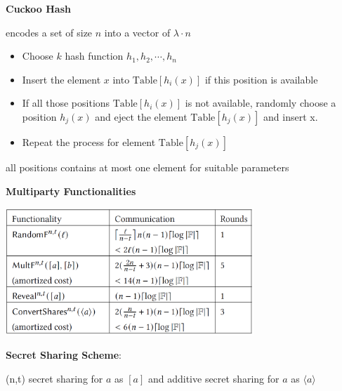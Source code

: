\begin{frame}

    \centering\textbf{Cuckoo Hash}

    \vspace{0.5cm}

    encodes a set of size $n$ into a vector of $\lambda \cdot n$


    \vspace{0.5cm}
    
    \begin{flushleft}
        \begin{itemize}
            \item Choose $k$ hash function $h_1,h_2,\cdots,h_n$
    
            \item Insert the element $x$ into $\text{Table}[h_i(x)]$ if this position is available
            
            \item If all those positions $\text{Table}[h_i(x)]$ is not available, randomly choose a position $h_j(x)$ and eject the element $\text{Table}[h_j(x)]$ and insert x.
            \item Repeat the process for element $\text{Table}[h_j(x)]$ 
        \end{itemize}
    \end{flushleft}

    \vspace{0.5cm}

    all positions contains at most one element for suitable parameters

    \vspace{0.4cm}



\end{frame}




\begin{frame}

    \centering\textbf{Multiparty Functionalities}

    \vspace{0.5cm}
    
    \centering\includegraphics[width=0.7\textwidth]{figure/func.png}

    \vspace{0.4cm}

    \textbf{Secret Sharing Scheme}:

    (n,t) secret sharing for $a$ as $[a]$ and additive secret sharing for $a$ as $\langle a \rangle$

\end{frame}

